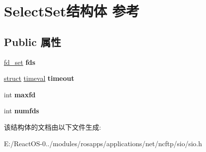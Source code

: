 \hypertarget{struct_select_set}{}\section{Select\+Set结构体 参考}
\label{struct_select_set}
\subsection*{Public 属性}
\begin{DoxyCompactItemize}
\item 
\mbox{\label{struct_select_set_afbb7dad57ab0ba93c03c5626767c0393}} 
\hyperlink{structfd__set}{fd\+\_\+set} {\bfseries fds}
\item 
\mbox{\label{struct_select_set_a483b0fb49f0b31305f1bfc3c1281f224}} 
\hyperlink{interfacestruct}{struct} \hyperlink{structtimeval}{timeval} {\bfseries timeout}
\item 
\mbox{\label{struct_select_set_a904afdc566d424bcab45b00d8d5027a3}} 
int {\bfseries maxfd}
\item 
\mbox{\label{struct_select_set_a0a0105f56280cc10cfef4385043d6dc5}} 
int {\bfseries numfds}
\end{DoxyCompactItemize}


该结构体的文档由以下文件生成\+:\begin{DoxyCompactItemize}
\item 
E\+:/\+React\+O\+S-\/0../modules/rosapps/applications/net/ncftp/sio/sio.\+h\end{DoxyCompactItemize}
